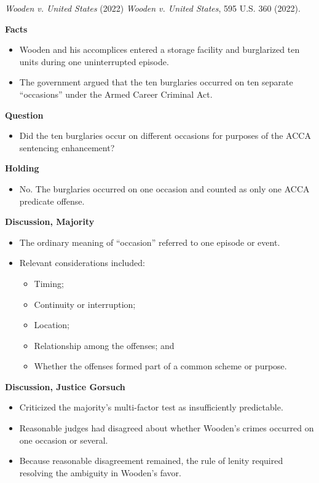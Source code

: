 \documentclass[11pt]{tex/lawoutline}
\begin{document}
\casebox
{\textit{Wooden v. United States} (2022)}
{\textit{Wooden v. United States}, 595 U.S. 360 (2022).}
{
\textbf{Facts}
\begin{itemize}
    \item Wooden and his accomplices entered a storage facility and burglarized ten units during one uninterrupted episode.
    \item The government argued that the ten burglaries occurred on ten separate ``occasions'' under the Armed Career Criminal Act.
\end{itemize}

\textbf{Question}
\begin{itemize}
    \item Did the ten burglaries occur on different occasions for purposes of the ACCA sentencing enhancement?
\end{itemize}

\textbf{Holding}
\begin{itemize}
    \item No. The burglaries occurred on one occasion and counted as only one ACCA predicate offense.
\end{itemize}

\textbf{Discussion, Majority}{
\begin{itemize}
    \item The ordinary meaning of ``occasion'' referred to one episode or event.
    \item Relevant considerations included:
    \begin{itemize}
        \item Timing;
        \item Continuity or interruption;
        \item Location;
        \item Relationship among the offenses; and
        \item Whether the offenses formed part of a common scheme or purpose.
    \end{itemize}
\end{itemize}
}

\textbf{Discussion, Justice Gorsuch}{
\begin{itemize}
    \item Criticized the majority's multi-factor test as insufficiently predictable.
    \item Reasonable judges had disagreed about whether Wooden's crimes occurred on one occasion or several.
    \item Because reasonable disagreement remained, the rule of lenity required resolving the ambiguity in Wooden's favor.
\end{itemize}
}
}
\end{document}
